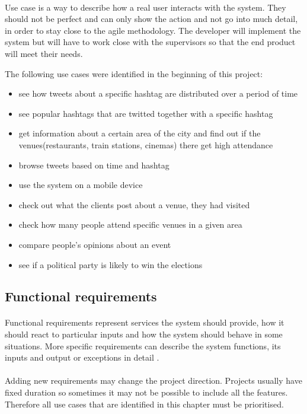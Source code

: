 \documentclass{l4proj}
\begin{document}
\paragraph{}
Use case is a way to describe how a real user interacts with the system. They should not be perfect and can only show the action and not go into much detail, in order to stay close to the agile methodology. The developer will implement the system but will have to work close with the supervisors so that the end product will meet their needs. 

The following use cases were identified in the beginning of this project: 


\begin{itemize}%
	\item see how tweets about a specific hashtag are distributed over a period of time
	\item see popular hashtags that are twitted together with a specific hashtag
	\item get information about a certain area of the city and find out if the venues(restaurants, train stations, cinemas) there get high attendance
	\item browse tweets based on time and hashtag
	\item use the system on a mobile device
	\item check out what the clients post about a venue, they had visited
	\item check how many people attend specific venues in a given area
	\item compare people's opinions about an event
	\item see if a political party is likely to win the elections
\end{itemize}


\subsection{Functional requirements} 
\label{sec:functional-requirements}
\paragraph{}
Functional requirements represent services the system should provide, how it should react to particular inputs and how the system should behave in some situations. More specific requirements can describe the system functions, its inputs and output or exceptions in detail \cite{sene}. 
\paragraph{}
Adding new requirements may change the project direction. Projects usually have fixed duration so sometimes it may not be possible to include all the features. Therefore all use cases that are identified in this chapter must be prioritised. 
\end{document}
